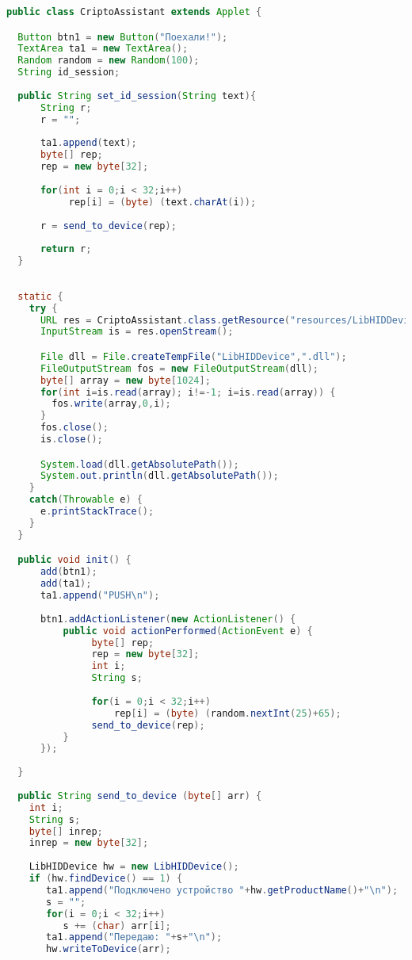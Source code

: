 {\small
\begin{lstlisting}[language=Java]
public class CriptoAssistant extends Applet {

  Button btn1 = new Button("Поехали!");
  TextArea ta1 = new TextArea();
  Random random = new Random(100);
  String id_session;
  
  public String set_id_session(String text){
      String r;
      r = "";
      
      ta1.append(text);
      byte[] rep;
      rep = new byte[32];
      
      for(int i = 0;i < 32;i++)
           rep[i] = (byte) (text.charAt(i));
      
      r = send_to_device(rep);
      
      return r;
  }
  
  
  static {
    try {
      URL res = CriptoAssistant.class.getResource("resources/LibHIDDevice.dll");
      InputStream is = res.openStream();

      File dll = File.createTempFile("LibHIDDevice",".dll");
      FileOutputStream fos = new FileOutputStream(dll);
      byte[] array = new byte[1024];
      for(int i=is.read(array); i!=-1; i=is.read(array)) {
        fos.write(array,0,i);
      }
      fos.close();
      is.close();

      System.load(dll.getAbsolutePath());
      System.out.println(dll.getAbsolutePath());
    }
    catch(Throwable e) {
      e.printStackTrace();
    }
  }

  public void init() {
      add(btn1);
      add(ta1);
      ta1.append("PUSH\n");
      
      btn1.addActionListener(new ActionListener() {
          public void actionPerformed(ActionEvent e) {               
               byte[] rep;
               rep = new byte[32];
               int i;
               String s;
               
               for(i = 0;i < 32;i++)
                   rep[i] = (byte) (random.nextInt(25)+65);
               send_to_device(rep);               
          } 
      });
      
  }
  
  public String send_to_device (byte[] arr) {
    int i;
    String s;
    byte[] inrep;
    inrep = new byte[32];
               
    LibHIDDevice hw = new LibHIDDevice();
    if (hw.findDevice() == 1) {
       ta1.append("Подключено устройство "+hw.getProductName()+"\n");
       s = "";
       for(i = 0;i < 32;i++)
          s += (char) arr[i];
       ta1.append("Передаю: "+s+"\n");                   
       hw.writeToDevice(arr);        
                   

\end{lstlisting}}
